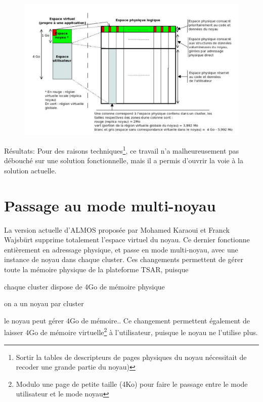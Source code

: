       \begin{figure}[!h]
        \centering \includegraphics[scale=0.17]{include/img/almos-guerret}
        \caption{}
        \label{almos-guerret}
      \end{figure}
      
      \begin{paragraph}{Résultats:}
        Pour des raisons techniques\footnote{Sortir la tables de descripteurs de
          pages physiques du noyau nécessitait de recoder une grande partie du
          noyau)}, ce travail n'a malheureusement pas débouché sur une solution
        fonctionnelle, mais il a permis d'ouvrir la voie à la solution actuelle.
      \end{paragraph}

      
  \section{Passage au mode multi-noyau}
      
    La version actuelle d'ALMOS proposée par Mohamed Karaoui et Franck Wajsbürt
    supprime totalement l'espace virtuel du noyau. Ce dernier fonctionne
    entièrement en adressage physique, et passe en mode multi-noyau, avec une
    instance de noyau dans chaque cluster. Ces changements permettent de gérer
    toute la mémoire physique de la plateforme TSAR, puisque \benumline \item
    chaque cluster dispose de 4Go de mémoire physique \item on a un noyau par
    cluster \item le noyau peut gérer 4Go de mémoire.\eenumline. Ce changement
    permettent également de laisser 4Go de mémoire virtuelle\footnote{Modulo une
      page de petite taille (4Ko) pour faire le passage entre le mode
      utilisateur et le mode noyau} à l'utilisateur, puisque le noyau ne
    l'utilise plus.


